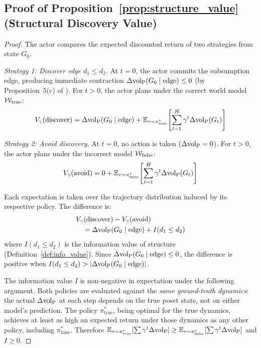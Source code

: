 \subsection{Proof of Proposition~\ref{prop:structure_value} (Structural Discovery Value)}
\label{app:proof_structure_value}

\begin{proof}
The actor compares the expected discounted return of two strategies from
state $G_0$.

\emph{Strategy 1: Discover edge $d_1 \leq d_2$.} At $t = 0$, the actor
commits the subsumption edge, producing immediate contraction
$\Delta {\operatorname{vol}_{\mathrm{P}}}(G_0 \mid \text{edge}) \leq 0$ (by Proposition~5(c) of
\citet{lasser2026poset}). For $t > 0$, the actor plans under the correct
world model $\mathcal{W}_{\text{true}}$:
\[
V_\gamma(\text{discover}) = \Delta {\operatorname{vol}_{\mathrm{P}}}(G_0 \mid \text{edge}) +
\mathbb{E}_{\tau \sim \pi^*_{\text{true}}}\!\left[
\sum_{t=1}^{H} \gamma^t \Delta {\operatorname{vol}_{\mathrm{P}}}(G_t)\right]
\]

\emph{Strategy 2: Avoid discovery.} At $t = 0$, no action is taken
($\Delta {\operatorname{vol}_{\mathrm{P}}} = 0$). For $t > 0$, the actor plans under the incorrect
model $\mathcal{W}_{\text{false}}$:
\[
V_\gamma(\text{avoid}) = 0 +
\mathbb{E}_{\tau \sim \pi^*_{\text{false}}}\!\left[
\sum_{t=1}^{H} \gamma^t \Delta {\operatorname{vol}_{\mathrm{P}}}(G_t)\right]
\]

Each expectation is taken over the trajectory distribution induced by its
respective policy. The difference is:
\begin{align*}
&V_\gamma(\text{discover}) - V_\gamma(\text{avoid}) \\
&\quad = \Delta {\operatorname{vol}_{\mathrm{P}}}(G_0 \mid \text{edge})
    + I(d_1 \leq d_2)
\end{align*}
where $I(d_1 \leq d_2)$ is the information value of structure
(Definition~\ref{def:info_value}). Since
$\Delta {\operatorname{vol}_{\mathrm{P}}}(G_0 \mid \text{edge}) \leq 0$, the difference is positive
when $I(d_1 \leq d_2) > |\Delta {\operatorname{vol}_{\mathrm{P}}}(G_0 \mid \text{edge})|$.

The information value $I$ is non-negative in expectation under the
following argument. Both policies are evaluated against the \emph{same
ground-truth dynamics}: the actual $\Delta{\operatorname{vol}_{\mathrm{P}}}$ at each step depends on
the true poset state, not on either model's prediction. The policy
$\pi^*_{\text{true}}$, being optimal for the true dynamics, achieves at
least as high an expected return under those dynamics as any other policy,
including $\pi^*_{\text{false}}$. Therefore
$\mathbb{E}_{\tau \sim \pi^*_{\text{true}}}[\sum \gamma^t \Delta{\operatorname{vol}_{\mathrm{P}}}]
\geq \mathbb{E}_{\tau \sim \pi^*_{\text{false}}}[\sum \gamma^t \Delta{\operatorname{vol}_{\mathrm{P}}}]$
and $I \geq 0$.
\end{proof}

